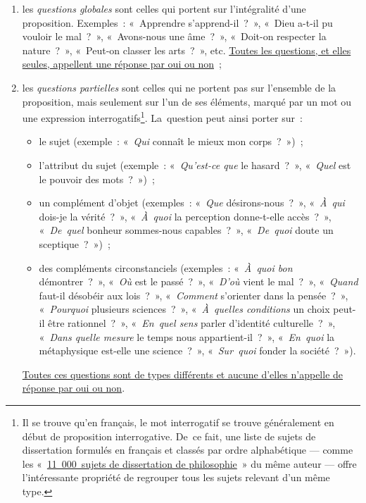 \documentclass[a4paper,12pt]{report}
\begin{document}
\begin{enumerate}
\item les \emph{questions globales} sont celles qui portent sur l'intégralité
d'une proposition. Exemples : « Apprendre s’apprend-il ? », « Dieu
a-t-il pu vouloir le mal ? », « Avons-nous une âme ? », « Doit-on
respecter la nature ? », « Peut-on classer les arts ? », etc. \uline{Toutes
les questions, et elles seules, appellent une réponse par oui ou
non} ;

\item les \emph{questions partielles} sont celles qui ne portent pas sur
l'ensemble de la proposition, mais seulement sur l'un de ses
éléments, marqué par un mot ou une expression interrogatifs\footnote{Il se trouve qu'en français, le mot interrogatif se trouve
généralement en début de proposition interrogative. De ce fait, une
liste de sujets de dissertation formulés en français et classés par
ordre alphabétique — comme les « \href{http://baptiste.meles.free.fr/site/BMeles-9000\_sujets\_dissertation\_philosophie.pdf}{11 000 sujets de dissertation de
philosophie} » du même auteur — offre l'intéressante propriété de
regrouper tous les sujets relevant d'un même type.}.
La question peut ainsi porter sur :
\begin{itemize}
\item le sujet (exemple : « \emph{Qui} connaît le mieux mon corps ? ») ;
\item l'attribut du sujet (exemple : « \emph{Qu'est-ce que} le hasard ? »,
« \emph{Quel} est le pouvoir des mots ? ») ;
\item un complément d'objet (exemples : « \emph{Que} désirons-nous ? »,
« \emph{À qui} dois-je la vérité ? », « \emph{À quoi} la perception
donne-t-elle accès ? », « \emph{De quel} bonheur sommes-nous
capables ? », « \emph{De quoi} doute un sceptique ? ») ;
\item des compléments circonstanciels (exemples : « \emph{À quoi bon}
démontrer ? », « \emph{Où} est le passé ? », « \emph{D'où} vient le mal ? »,
« \emph{Quand} faut-il désobéir aux lois ? », « \emph{Comment} s’orienter
dans la pensée ? », « \emph{Pourquoi} plusieurs sciences ? »,
« \emph{À quelles conditions} un choix peut-il être rationnel ? »,
« \emph{En quel sens} parler d'identité culturelle ? », « \emph{Dans quelle
mesure} le temps nous appartient-il ? », « \emph{En quoi} la
métaphysique est-elle une science ? », « \emph{Sur quoi} fonder la
société ? »).
\end{itemize}
\uline{Toutes ces questions sont de types différents et aucune d'elles
n'appelle de réponse par oui ou non}.
\end{enumerate}
\end{document}
